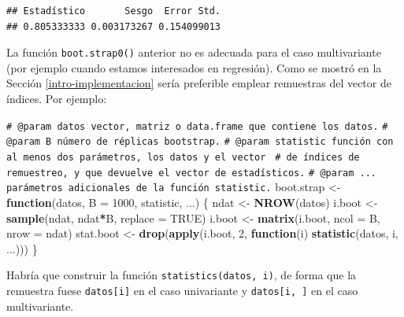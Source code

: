 \documentclass[
]{book}
\newenvironment{Shaded}{\begin{snugshade}}{\end{snugshade}}
\newcommand{\AttributeTok}[1]{\textcolor[rgb]{0.13,0.29,0.53}{#1}}
\newcommand{\CommentTok}[1]{\textcolor[rgb]{0.56,0.35,0.01}{\textit{#1}}}
\newcommand{\ConstantTok}[1]{\textcolor[rgb]{0.56,0.35,0.01}{#1}}
\newcommand{\ControlFlowTok}[1]{\textcolor[rgb]{0.13,0.29,0.53}{\textbf{#1}}}
\newcommand{\DecValTok}[1]{\textcolor[rgb]{0.00,0.00,0.81}{#1}}
\newcommand{\FunctionTok}[1]{\textcolor[rgb]{0.13,0.29,0.53}{\textbf{#1}}}
\newcommand{\NormalTok}[1]{#1}
\newcommand{\OtherTok}[1]{\textcolor[rgb]{0.56,0.35,0.01}{#1}}
\newcommand{\SpecialCharTok}[1]{\textcolor[rgb]{0.81,0.36,0.00}{\textbf{#1}}}
\theoremstyle{break}
\theoremstyle{nonumberplain}
\renewcommand{\CommentTok}[1]{\textcolor[rgb]{0.41,0.41,0.41}{\texttt{#1}}}
\begin{document}
\begin{verbatim}
## Estadístico       Sesgo  Error Std. 
## 0.805333333 0.003173267 0.154099013
\end{verbatim}

La función \texttt{boot.strap0()} anterior no es adecuada para el caso multivariante (por ejemplo cuando estamos interesados en regresión).
Como se mostró en la Sección \ref{intro-implementacion} sería preferible emplear remuestras del vector de índices. Por ejemplo:

\begin{Shaded}
\begin{Highlighting}[]
\CommentTok{\#\textquotesingle{} @param datos vector, matriz o data.frame que contiene los datos.}
\CommentTok{\#\textquotesingle{} @param B número de réplicas bootstrap.}
\CommentTok{\#\textquotesingle{} @param statistic función con al menos dos parámetros, los datos y el vector }
\CommentTok{\#\textquotesingle{}        de índices de remuestreo, y que devuelve el vector de estadísticos.}
\CommentTok{\#\textquotesingle{} @param ... parámetros adicionales de la función statistic.}
\NormalTok{boot.strap }\OtherTok{\textless{}{-}} \ControlFlowTok{function}\NormalTok{(datos, }\AttributeTok{B =} \DecValTok{1000}\NormalTok{, statistic, ...) \{}
\NormalTok{  ndat }\OtherTok{\textless{}{-}} \FunctionTok{NROW}\NormalTok{(datos)}
\NormalTok{  i.boot }\OtherTok{\textless{}{-}} \FunctionTok{sample}\NormalTok{(ndat, ndat}\SpecialCharTok{*}\NormalTok{B, }\AttributeTok{replace =} \ConstantTok{TRUE}\NormalTok{)}
\NormalTok{  i.boot }\OtherTok{\textless{}{-}} \FunctionTok{matrix}\NormalTok{(i.boot, }\AttributeTok{ncol =}\NormalTok{ B, }\AttributeTok{nrow =}\NormalTok{ ndat)}
\NormalTok{  stat.boot }\OtherTok{\textless{}{-}} \FunctionTok{drop}\NormalTok{(}\FunctionTok{apply}\NormalTok{(i.boot, }\DecValTok{2}\NormalTok{, }\ControlFlowTok{function}\NormalTok{(i) }\FunctionTok{statistic}\NormalTok{(datos, i, ...)))}
\NormalTok{\}}
\end{Highlighting}
\end{Shaded}

Habría que construir la función \texttt{statistics(datos,\ i)}, de forma que la remuestra fuese \texttt{datos{[}i{]}} en el caso univariante y \texttt{datos{[}i,\ {]}} en el caso multivariante.
\end{document}
